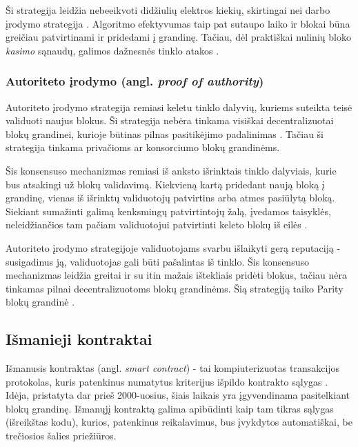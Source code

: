Ši strategija leidžia nebeeikvoti didžiulių elektros kiekių, skirtingai nei darbo įrodymo strategija \cite{Ethereum}. Algoritmo efektyvumas
taip pat sutaupo laiko ir blokai būna greičiau patvirtinami ir pridedami į grandinę. Tačiau, dėl praktiškai nulinių bloko \textit{kasimo} sąnaudų,
galimos dažnesnės tinklo atakos \cite{Zheng2017}. 

\subsubsection{Autoriteto įrodymo (angl. \textit{proof of authority})}

Autoriteto įrodymo strategija remiasi keletu tinklo dalyvių, kuriems suteikta teisė validuoti naujus blokus. Ši strategija nebėra tinkama visiškai
decentralizuotai blokų grandinei, kurioje būtinas pilnas pasitikėjimo padalinimas \cite{ProofOfAuthority}. Tačiau ši strategija tinkama privačioms
ar konsorciumo blokų grandinėms.

Šis konsensuso mechanizmas remiasi iš anksto išrinktais tinklo dalyviais, kurie bus atsakingi už blokų validavimą. Kiekvieną kartą pridedant naują
bloką į grandinę, vienas iš išrinktų validuotojų patvirtins arba atmes pasiūlytą bloką. Siekiant sumažinti galimą kenksmingų patvirtintojų žalą,
įvedamos taisyklės, neleidžiančios tam pačiam validuotojui patvirtinti keleto blokų iš eilės \cite{ProofOfAuthority}.

Autoriteto įrodymo strategijoje validuotojams svarbu išlaikyti gerą reputaciją - susigadinus ją, validuotojas gali būti pašalintas iš tinklo. Šis konsensuso mechanizmas
leidžia greitai ir su itin mažais ištekliais pridėti blokus, tačiau nėra tinkamas pilnai decentralizuotoms blokų grandinėms. Šią strategiją
taiko Parity blokų grandinė \cite{ProofOfAuthority}.

\subsection{Išmanieji kontraktai}

Išmanusis kontraktas (angl. \textit{smart contract}) - tai kompiuterizuotas transakcijos protokolas, kuris patenkinus numatytus kriterijus
išpildo kontrakto sąlygas \cite{Szabo1997}. Idėja, pristatyta dar prieš 2000-uosius, šiais laikais yra įgyvendinama pasitelkiant blokų grandinę.
Išmanųjį kontraktą galima apibūdinti kaip tam tikras sąlygas (išreikštas kodu), kurios, patenkinus reikalavimus, bus įvykdytos automatiškai,
be trečiosios šalies priežiūros. 

